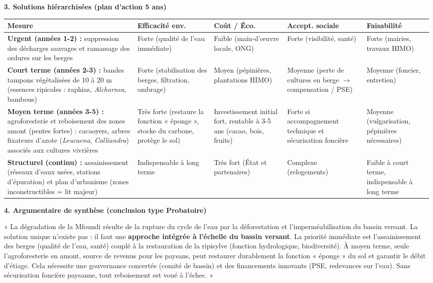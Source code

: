 \documentclass[11pt]{article}
\begin{document}
\begin{experience}
\textbf{3. Solutions hiérarchisées (plan d'action 5 ans)}\par
\begin{center}
\begin{tabularx}{\linewidth}{|l|X|X|X|X|}\hline
\rowcolor{popblueL}\textbf{Mesure} & \textbf{Efficacité env.} & \textbf{Coût / Éco.} & \textbf{Accept. sociale} & \textbf{Faisabilité} \\ \hline
\textbf{Urgent (années 1-2) :} suppression des décharges sauvages et ramassage des ordures sur les berges & Forte (qualité de l'eau immédiate) & Faible (main-d'œuvre locale, ONG) & Forte (visibilité, santé) & Forte (mairies, travaux HIMO) \\ \hline
\textbf{Court terme (années 2-3) :} bandes tampons végétalisées de 10 à 20 m (essences ripicoles : raphias, \emph{Alchornea}, bambous) & Forte (stabilisation des berges, filtration, ombrage) & Moyen (pépinières, plantations HIMO) & Moyenne (perte de cultures en berge $\rightarrow$ compensation / PSE) & Moyenne (foncier, entretien) \\ \hline
\textbf{Moyen terme (années 3-5) :} agroforesterie et reboisement des zones amont (pentes fortes) : cacaoyers, arbres fixateurs d'azote (\emph{Leucaena}, \emph{Calliandra}) associés aux cultures vivrières & Très forte (restaure la fonction « éponge », stocke du carbone, protège le sol) & Investissement initial fort, rentable à 3-5 ans (cacao, bois, fruits) & Forte si accompagnement technique et sécurisation foncière & Moyenne (vulgarisation, pépinières nécessaires) \\ \hline
\textbf{Structurel (continu) :} assainissement (réseaux d'eaux usées, stations d'épuration) et plan d'urbanisme (zones inconstructibles = lit majeur) & Indispensable à long terme & Très fort (État et partenaires) & Complexe (relogements) & Faible à court terme, indispensable à long terme \\ \hline
\end{tabularx}
\end{center}

\textbf{4. Argumentaire de synthèse (conclusion type Probatoire)}\par
« La dégradation de la Mfoundi résulte de la rupture du cycle de l'eau par la déforestation et l'imperméabilisation du bassin versant. La solution unique n'existe pas : il faut une \textbf{approche intégrée à l'échelle du bassin versant}. La priorité immédiate est l'assainissement des berges (qualité de l'eau, santé) couplé à la restauration de la ripisylve (fonction hydrologique, biodiversité). À moyen terme, seule l'agroforesterie en amont, source de revenus pour les paysans, peut restaurer durablement la fonction « éponge » du sol et garantir le débit d'étiage. Cela nécessite une gouvernance concertée (comité de bassin) et des financements innovants (PSE, redevances sur l'eau). Sans sécurisation foncière paysanne, tout reboisement est voué à l'échec. »
\end{experience}
\end{document}
